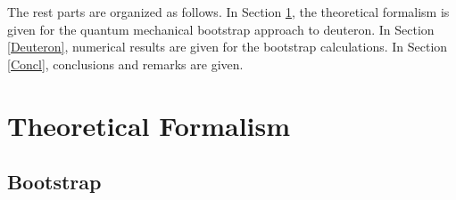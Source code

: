\documentclass[aps,prc,reprint,superscriptaddress,nofootinbib]{revtex4-2}
\begin{document}
The rest parts are organized as follows. 
In Section \ref{AQAO},
the  theoretical formalism is given for the quantum mechanical bootstrap approach to deuteron.
In Section \ref{Deuteron}, numerical results are given for the bootstrap calculations.
In Section \ref{Concl},
conclusions and remarks are given.

\section{
Theoretical Formalism
}
\label{AQAO}


\subsection{Bootstrap}
\label{BS}

\end{document}
